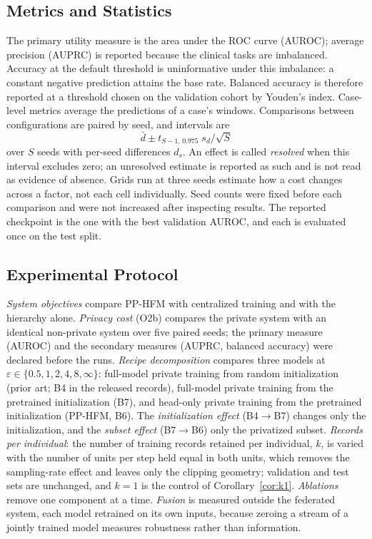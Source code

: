 \subsection{Metrics and Statistics}
The primary utility measure is the area under the ROC curve (AUROC); average
precision (AUPRC) is reported because the clinical tasks are imbalanced.
Accuracy at the default threshold is uninformative under this imbalance: a
constant negative prediction attains the base rate. Balanced accuracy is
therefore reported at a threshold chosen on the validation cohort by Youden's
index. Case-level metrics average the predictions of a case's windows.
Comparisons between configurations are paired by seed, and intervals are
\begin{equation}
\bar d \pm t_{S-1,\,0.975}\; s_d / \sqrt{S}
\label{eq:ci}
\end{equation}
over $S$ seeds with per-seed differences $d_s$. An effect is called
\emph{resolved} when this interval excludes zero; an unresolved estimate is
reported as such and is not read as evidence of absence. Grids run at three
seeds estimate how a cost changes across a factor, not each cell
individually. Seed counts were fixed before
each comparison and were not increased after inspecting results. The
reported checkpoint is the one with the best validation AUROC, and each is
evaluated once on the test split.

\subsection{Experimental Protocol}
\emph{System objectives} compare PP-HFM with centralized training and with the
hierarchy alone. \emph{Privacy cost} (O2b) compares the private system with
an identical non-private system over five paired seeds; the primary measure
(AUROC) and the secondary measures (AUPRC, balanced accuracy) were declared
before the runs. \emph{Recipe decomposition} compares three models at
$\varepsilon \in \{0.5, 1, 2, 4, 8, \infty\}$: full-model private training
from random initialization (prior art; B4 in the released records), full-model
private training from the pretrained initialization (B7), and head-only
private training from the pretrained initialization (PP-HFM, B6). The
\emph{initialization effect} (B4$\rightarrow$B7) changes only the
initialization, and the \emph{subset effect} (B7$\rightarrow$B6) only the
privatized subset.
\emph{Records per individual}: the number of training records retained per
individual, $k$, is varied with the number of units per step held equal in
both units, which removes the sampling-rate effect and leaves only the
clipping geometry; validation and test sets are unchanged, and $k = 1$ is the
control of Corollary~\ref{cor:k1}. \emph{Ablations} remove one component at a
time. \emph{Fusion} is measured outside the federated system, each model
retrained on its own inputs, because zeroing a stream of a jointly trained
model measures robustness rather than information.
